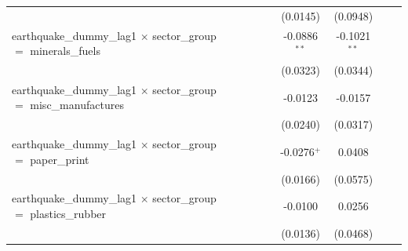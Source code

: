 \begin{tabular}{lcccccccc}
                                                                                  &                       &                       &                       &                       & (0.0145)              & (0.0948)              &                       &   \\   
   earthquake\_dummy\_lag1 $\times$ sector\_group $=$ minerals\_fuels             &                       &                       &                       &                       & -0.0886$^{**}$        & -0.1021$^{**}$        &                       &   \\   
                                                                                  &                       &                       &                       &                       & (0.0323)              & (0.0344)              &                       &   \\   
   earthquake\_dummy\_lag1 $\times$ sector\_group $=$ misc\_manufactures          &                       &                       &                       &                       & -0.0123               & -0.0157               &                       &   \\   
                                                                                  &                       &                       &                       &                       & (0.0240)              & (0.0317)              &                       &   \\   
   earthquake\_dummy\_lag1 $\times$ sector\_group $=$ paper\_print                &                       &                       &                       &                       & -0.0276$^{+}$         & 0.0408                &                       &   \\   
                                                                                  &                       &                       &                       &                       & (0.0166)              & (0.0575)              &                       &   \\   
   earthquake\_dummy\_lag1 $\times$ sector\_group $=$ plastics\_rubber            &                       &                       &                       &                       & -0.0100               & 0.0256                &                       &   \\   
                                                                                  &                       &                       &                       &                       & (0.0136)              & (0.0468)              &                       &   \\   

\end{tabular}
